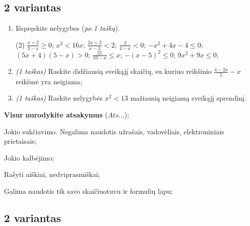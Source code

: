 \documentclass[a4paper]{article}
\begin{document}
\vspace*{12mm}

\subsection*{2 variantas}

\begin{enumerate}
      \item Išspręskite nelygybes (\textit{po 1 tašką}).

            \begin{tasks}[item-format={\normalfont}, after-item-skip=2mm](2)
                  \task $\frac{x+2}{3-x} \geqslant 0$;
                  \task $x^2<16x$;
                  \task $\frac{2x+2}{x-3}<2$;
                  \task $\frac{3}{4-x}<0$;
                  \task $-x^2+4x-4 \leqslant 0$;
                  \task $(5x+4)(5-x)>0$;
                  \task $\frac{25}{10-x} \leqslant x$;
                  \task $-(x-5)^2 \leqslant 0$;
                  \task $9x^2+9x \leq 0$;
            \end{tasks}

      \item \textit{(1 taškas)} Raskite didžiausią sveikąjį skaičių, su kuriuo reikšinio $\frac{4-2x}{5}-x$ reikšmė yra neigiama;
      \item \textit{(1 taškas)} Raskite nelygybės $x^2<13$ mažiausią neigiamą sveikąjį sprendinį.
\end{enumerate}

\begin{small}
      \begin{enumerate*}[label={(\arabic*)}]
            \item \textbf{Visur} \textbf{nurodykite atsakymus} ($Ats\ldots$);
            \item Jokio sukčiavimo. Negalima naudotis užrašais, vadovėliais,
            elektroniniais prietaisais;
            \item Jokio kalbėjimo;
            \item Rašyti aiškiai, nedviprasmiškai;
            \item Galima naudotis tik savo skaičiuotuvu ir formulių lapu;
      \end{enumerate*}
\end{small}

\vspace*{12mm}

\subsection*{2 variantas}
\end{document}
